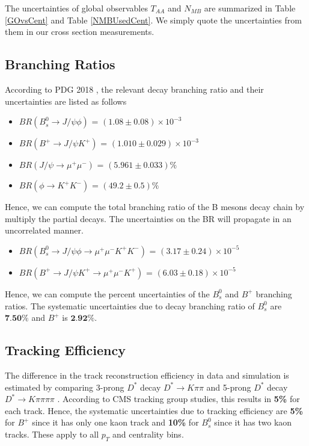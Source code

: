The uncertainties of global observables $T_{AA}$ and $N_{MB}$ are summarized in Table \ref{GOvsCent} and Table \ref{NMBUsedCent}. We simply quote the uncertainties from them in our cross section measurements. 

\subsection{Branching Ratios}

According to PDG 2018 \cite{PDG2018}, the relevant decay branching ratio and their uncertainties are listed as follows

\begin{itemize}
\item $BR(B^0_s \rightarrow J/\psi \phi)$ = $(1.08 \pm 0.08) \times 10^{-3}$
\item $BR(B^+ \rightarrow J/\psi K^+)$ = $(1.010 \pm 0.029) \times 10^{-3}$
\item $BR(J/\psi \rightarrow \mu^+ \mu^-)$ = $(5.961 \pm 0.033)\%$
\item $BR(\phi \rightarrow K^+ K^-)$ = $(49.2 \pm 0.5)\%$
\end{itemize}

Hence, we can compute the total branching ratio of the B mesons decay chain by multiply the partial decays. The uncertainties on the BR will propagate in an uncorrelated manner.   

\begin{itemize}
\item $BR(B^0_s \rightarrow J/\psi \phi  \rightarrow \mu^+ \mu^- K^+ K^-)$ = $(3.17 \pm 0.24) \times 10^{-5}$
\item $BR(B^+ \rightarrow J/\psi K^+  \rightarrow \mu^+ \mu^- K^+)$ = $(6.03 \pm 0.18) \times 10^{-5}$ 
\end{itemize}

Hence, we can compute the percent uncertainties of the $B^0_s$ and $B^+$ branching ratios. The systematic uncertainties due to decay branching ratio of $B^0_s$ are $\textbf{7.50\%}$ and $B^+$ is  $\textbf{2.92\%}$.

\subsection{Tracking Efficiency}

The difference in the track reconstruction efficiency in data and simulation is estimated by comparing 3-prong $D^{*}$ decay $D^{*} \rightarrow K \pi\pi$ and 5-prong $D^{*}$ decay $D^{*} \rightarrow K \pi\pi\pi\pi$ \cite{TrackEff}. According to CMS tracking group studies, this results in \textbf{5\%} for each track. Hence, the systematic uncertainties due to tracking efficiency are \textbf{5\%} for $B^+$ since it has only one kaon track and \textbf{10\%} for $B^0_s$ since it has two kaon tracks. These apply to all $p_T$ and centrality bins.

